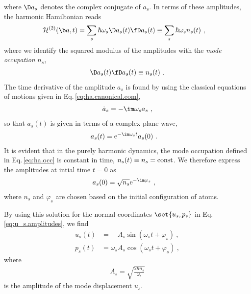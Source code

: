 where $\D a_s$ denotes the complex conjugate of $a_s$. 
In terms of these amplitudes, the harmonic Hamiltonian reads
\begin{align}
	\mathcal{H}^{(2)} (\b a, t)
		&= \sum_s \hbar \omega_s \D a_s (t) \fD a_s (t)
	\equiv \sum_s \hbar \omega_s n_s (t)~,
	\label{eq:Hamiltonian.aa}
\end{align}
where we identify the squared modulus of the amplitudes with the \emph{mode occupation} $n_s$,
\begin{align}
	\D a_s (t) \fD a_s (t) \equiv n_s (t)~.
	\label{eq:ha.occ}
\end{align}
The time derivative of the amplitude $a_s$ is found by using the classical equations of motions given in Eq.\,\eqref{eq:ha.canonical.eom},
\begin{align}
	\dot a_s
		= - \im \omega_s a_s~,
	\label{eq:dot_a_s}
\end{align}
so that $a_s (t)$ is given in terms of a complex plane wave,
	\begin{align}
		a_s (t) 
			& = {\rm e}^{- \im \omega_s t} a_s (0)~.
			\label{eq:a_s(t)}
	\end{align}
It is evident that in the purely harmonic dynamics, the mode occupation defined in Eq.\,\eqref{eq:ha.occ} is constant in time, $n_s (t) \equiv n_s = {\rm const}$. We therefore express the amplitudes at intial time $t=0$ as
\begin{align}
	a_s (0)
		& = \sqrt{n_s} {\rm e}^{- \im \varphi_s}~,
\end{align}
where $n_s$ and $\varphi_s$ are chosen based on the initial configuration of atoms.


By using this solution for the normal coordinates $\set{u_s, p_s}$ in Eq.\,\eqref{eq:u_s.amplitudes}, we find
\begin{subequations}
	\label{eq:u_p_st}
	\begin{align}
	u_s (t) 
	&= \phantom{\omega_s} A_s \sin (\omega_s t + \varphi_s)~,
	\label{eq:u_s(t)}
	\\
	p_s (t) 
	&= \omega_s A_s \cos (\omega_s t + \varphi_s)~,
	\end{align}
\end{subequations}
where 
\begin{align}
	A_s = \sqrt{\frac{2 \hbar n_s}{\omega_s}}
\end{align}
is the amplitude of the mode displacement $u_s$.

